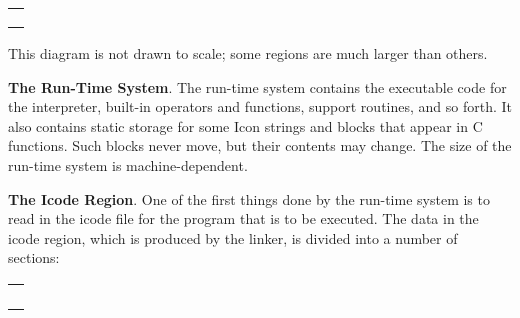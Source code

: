 \begin{center}
\tabletail{}
\tablelasttail{}
\begin{xtabular}{|m{2.30666in}|}
\hline
\centering{}\\\hline
\centering{}\\\hline
\centering{}\\\hline
\centering{}\\\hline
\end{xtabular}
\end{center}

This diagram is not drawn to scale; some regions are much larger than others.


\textbf{The Run-Time System}. The run-time system contains the
executable code for the interpreter, built-in operators and functions,
support routines, and so forth. It also contains static storage for
some Icon strings and blocks that appear in C functions.
Such blocks never move, but their contents may change. The size of the
run-time system is machine-dependent.

\textbf{The Icode Region}. One of the first things done by the
run-time system is to read in the icode file for the program that is
to be executed. The data in the icode region, which is produced by the
linker, is divided into a number of sections:

\begin{center}
\tabletail{}
\tablelasttail{}
\begin{xtabular}{|m{2.2962599in}|}
\hline
\centering{}\\\hline
\centering{}\\\hline
\centering{}\\\hline
\centering{}\\\hline
\centering{}\\\hline
\end{xtabular}
\end{center}


